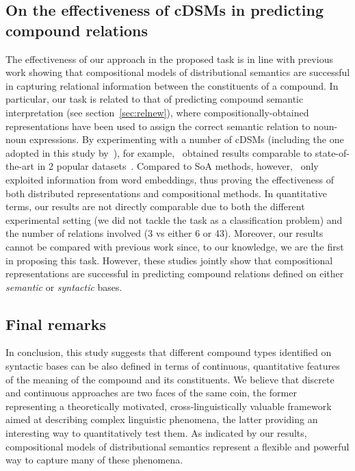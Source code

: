 \documentclass[output=paper]{langsci/langscibook}
\begin{document}
\subsection{On the effectiveness of cDSMs in predicting compound relations}


The effectiveness of our approach in the proposed task is in line with previous work showing that compositional models of distributional semantics are successful in capturing relational information between the constituents of a compound. In particular, our task is related to that of predicting compound semantic interpretation (see section~\ref{sec:relnew}), where compositionally-obtained representations have been used to assign the correct semantic relation to noun-noun expressions. By experimenting with a number of cDSMs (including the one adopted in this study by~\citealt{guevara2010}), for example,~\cite{dima2016compositionality} obtained results comparable to state-of-the-art in 2 popular datasets~\citep{o2007annotating,tratz2010taxonomy}. Compared to SoA methods, however,~\cite{dima2016compositionality} only exploited information from word embeddings, thus proving the effectiveness of both distributed representations and compositional methods. In quantitative terms, our results are not directly comparable due to both the different experimental setting (we did not tackle the task as a classification problem) and the number of relations involved (3 vs either 6 or 43). Moreover, our results cannot be compared with previous work since, to our knowledge, we are the first in proposing this task. However, these studies jointly show that compositional  representations are successful in predicting compound relations defined on either \emph{semantic} or \emph{syntactic} bases.


\subsection{Final remarks}

In conclusion, this study suggests that different compound types identified on syntactic bases can be also defined in terms of continuous, quantitative features of the meaning of the compound and its constituents. We believe that discrete and continuous approaches are two faces of the same coin, the former representing a theoretically motivated, cross-linguistically valuable framework aimed at describing complex linguistic phenomena, the latter providing an interesting way to quantitatively test them. As indicated by our results, compositional models of distributional semantics represent a flexible and powerful way to capture many of these phenomena.
\end{document}
